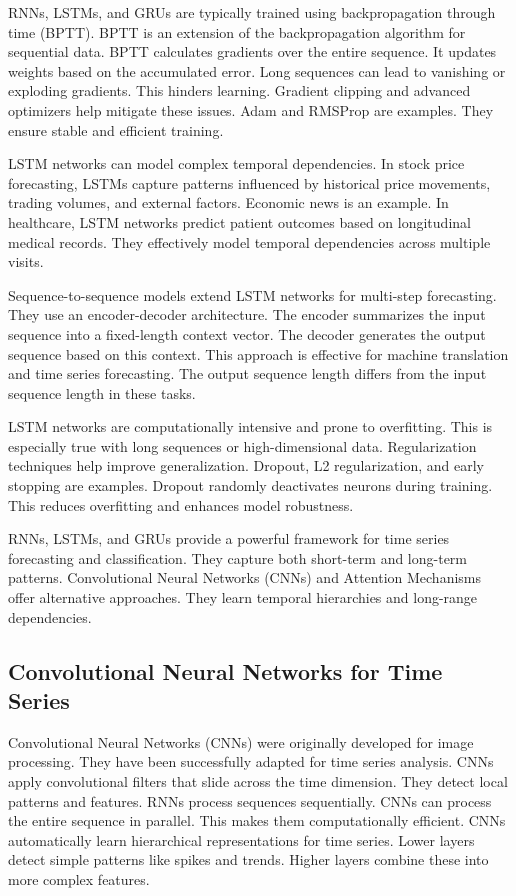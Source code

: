 RNNs, LSTMs, and GRUs are typically trained using backpropagation through time (BPTT). BPTT is an extension of the backpropagation algorithm for sequential data. BPTT calculates gradients over the entire sequence. It updates weights based on the accumulated error. Long sequences can lead to vanishing or exploding gradients. This hinders learning. Gradient clipping and advanced optimizers help mitigate these issues. Adam and RMSProp are examples. They ensure stable and efficient training.

LSTM networks can model complex temporal dependencies. In stock price forecasting, LSTMs capture patterns influenced by historical price movements, trading volumes, and external factors. Economic news is an example. In healthcare, LSTM networks predict patient outcomes based on longitudinal medical records. They effectively model temporal dependencies across multiple visits.

Sequence-to-sequence models extend LSTM networks for multi-step forecasting. They use an encoder-decoder architecture. The encoder summarizes the input sequence into a fixed-length context vector. The decoder generates the output sequence based on this context. This approach is effective for machine translation and time series forecasting. The output sequence length differs from the input sequence length in these tasks.

LSTM networks are computationally intensive and prone to overfitting. This is especially true with long sequences or high-dimensional data. Regularization techniques help improve generalization. Dropout, L2 regularization, and early stopping are examples. Dropout randomly deactivates neurons during training. This reduces overfitting and enhances model robustness.

RNNs, LSTMs, and GRUs provide a powerful framework for time series forecasting and classification. They capture both short-term and long-term patterns. Convolutional Neural Networks (CNNs) and Attention Mechanisms offer alternative approaches. They learn temporal hierarchies and long-range dependencies.

\subsection{Convolutional Neural Networks for Time Series}

Convolutional Neural Networks (CNNs) were originally developed for image processing. They have been successfully adapted for time series analysis. CNNs apply convolutional filters that slide across the time dimension. They detect local patterns and features. RNNs process sequences sequentially. CNNs can process the entire sequence in parallel. This makes them computationally efficient. CNNs automatically learn hierarchical representations for time series. Lower layers detect simple patterns like spikes and trends. Higher layers combine these into more complex features.

